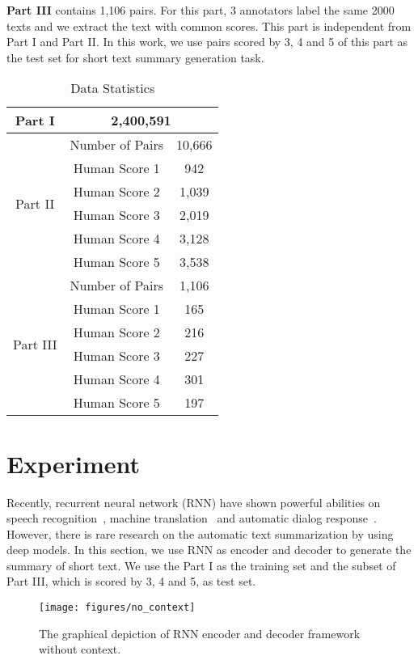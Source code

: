 \documentclass[11pt,a4paper]{article}
\begin{document}
\textbf{Part III} contains 1,106 pairs.
 For this part,  3 annotators label the same 2000 texts and we extract the text with common scores. This part is independent from Part I and Part II. In this work, we use pairs scored by 3, 4 and 5 of this part as the test set for short text summary generation task.

\begin{table}[!h]
\begin{center}
\begin{tabular}{|c|c|c|}
\hline
Part I & \multicolumn{2}{c|}{2,400,591} \\
\hline
\multirow{6}{*}{Part II} & Number of Pairs & 10,666\\
\cline{2-3}
& Human Score 1 & 942 \\
 \cline{2-3}
  & Human Score 2 & 1,039  \\
 \cline{2-3}
  & Human Score 3 & 2,019  \\
   \cline{2-3}
  & Human Score 4 & 3,128  \\
   \cline{2-3}
  &Human Score  5 & 3,538  \\
\hline

\multirow{6}{*}{Part III} & Number of Pairs &1,106 \\
 \cline{2-3}
& Human Score 1 & 165 \\
 \cline{2-3}
  & Human Score 2 & 216  \\
 \cline{2-3}
  & Human Score 3 & 227  \\
   \cline{2-3}
  & Human Score 4 & 301  \\
   \cline{2-3}
  &Human Score  5 & 197  \\
\hline
\end{tabular}
\end{center}
\vspace{-10pt}
\caption{Data Statistics}
\label{tabel_sta}
\vspace{-5pt}
\end{table}

\section{Experiment}
\vspace{-2pt}

Recently, recurrent neural network (RNN) have shown powerful abilities on speech recognition~\cite{speech}, machine translation~\cite{google} and automatic dialog response~\cite{lifeng}. However, there is rare research on the automatic text summarization by using deep models. In this section, we use RNN as encoder and decoder to generate the summary of short text. We use the Part I as the training set and the subset of Part III, which is scored by 3, 4 and 5, as test set.
\begin{figure}[!tb]
\centering
\texttt{[image: figures/no\_context]}
\vspace{-25pt}
\caption{The graphical depiction of  RNN encoder and decoder framework without context. }
\label{model_no_context}
\vspace{-1pt}
\end{figure}
\end{document}

